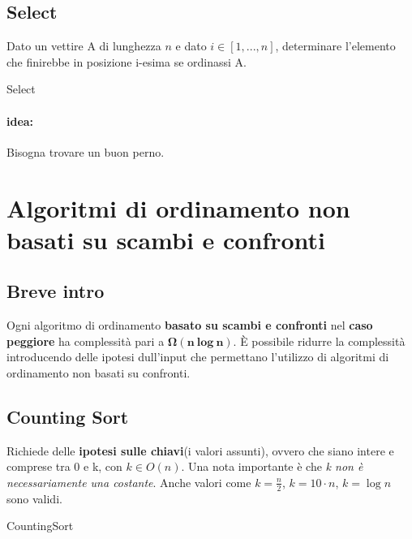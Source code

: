 \documentclass{article}
\begin{document}
\hypertarget{select}{}\subsection{Select} %
Dato un vettire A di lunghezza $n$ e dato $i \in [1,...,n]$, determinare l'elemento che finirebbe in posizione i-esima se ordinassi A. 

\begin{algorithm}[H]
\caption{Select}
\end{algorithm}
\paragraph{idea:} Bisogna trovare un buon perno.

\section{Algoritmi di ordinamento non basati su scambi e confronti}

\subsection{Breve intro}
Ogni algoritmo di ordinamento \textbf{basato su scambi e confronti} nel \textbf{caso peggiore} ha complessità pari a $\mathbf{\Omega(n \ log \ n)}$. 
È possibile ridurre la complessità introducendo delle ipotesi dull'input che permettano l'utilizzo di algoritmi di ordinamento non basati su confronti.

\hypertarget{countingsort}{\subsection{Counting Sort}} %
Richiede delle \textbf{ipotesi sulle chiavi}(i valori assunti), ovvero che siano intere e comprese tra 0 e k, con \textbf{$k \in O(n)$}. Una nota importante è 
che \textit{k non è necessariamente una costante}. Anche valori come $k = \frac{n}{2}$, $k = 10 \cdot n$, $k = \log n$ sono validi.


\begin{algorithm}[H]
\caption{CountingSort}
\end{algorithm}
\end{document}
